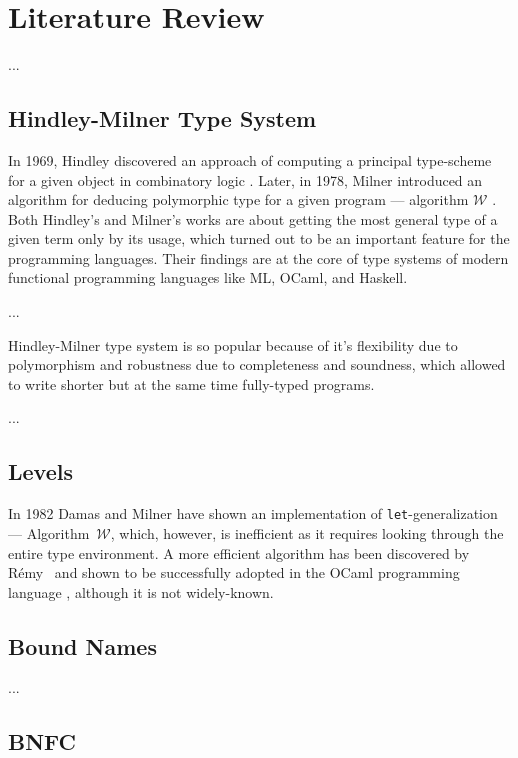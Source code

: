 \chapter{Literature Review}
\label{chap:lr}



...

\section{Hindley-Milner Type System}

In 1969, Hindley discovered an approach of computing a principal type-scheme for a given object in combinatory logic \cite{Hindley1969_PrincipalTypeScheme}. Later, in 1978, Milner introduced an algorithm for deducing polymorphic type for a given program — algorithm $\mathcal{W}$ \cite{Milner1978_TypePolymorphism}. Both Hindley's and Milner's works are about getting the most general type of a given term only by its usage, which turned out to be an important feature for the programming languages. Their findings are at the core of type systems of modern functional programming languages like ML, OCaml, and Haskell.

...

Hindley-Milner type system is so popular because of it's flexibility due to polymorphism and robustness due to completeness and soundness, which allowed to write shorter but at the same time fully-typed programs.

...

\section{Levels}

In 1982 Damas and Milner \cite{DamasMilner1982_TypeSchemes} have shown an implementation of \texttt{let}-generalization — Algorithm~$\mathcal{W}$, which, however, is inefficient as it requires looking through the entire type environment.
A more efficient algorithm has been discovered by R\'emy~\cite{Remy1992_SortedEqTheoryTypes} and shown to be successfully adopted in the OCaml programming language \cite{Kiselyov2022_OCamplTypeChecker}, although it is not widely-known.

\section{Bound Names}

...

\section{BNFC}
